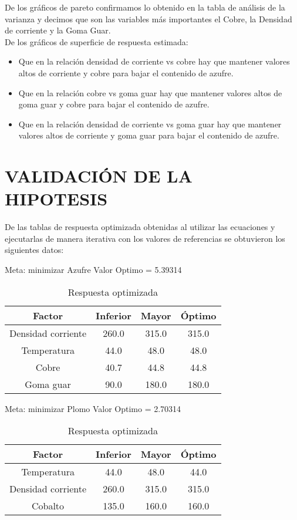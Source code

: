 De los gr\'aficos de pareto confirmamos lo obtenido en la tabla de an\'alisis de la varianza y decimos que son las variables m\'as importantes el Cobre, la Densidad de corriente y la Goma Guar.\\

De los gr\'aficos de superficie de respuesta estimada:
\begin{itemize}
 \item Que en la relaci\'on densidad de corriente vs cobre hay que mantener valores altos de corriente y cobre para bajar el contenido de azufre.
 \item Que en la relaci\'on cobre vs goma guar hay que mantener valores altos de goma guar y cobre para bajar el contenido de azufre.
 \item Que en la relaci\'on densidad de corriente vs goma guar hay que mantener valores altos de corriente y goma guar para bajar el contenido de azufre.
\end{itemize}

\section{VALIDACI\'ON DE LA HIPOTESIS}
De las tablas de respuesta optimizada obtenidas al utilizar las ecuaciones y ejecutarlas de manera iterativa con los valores de referencias se obtuvieron los siguientes datos:

Meta: minimizar Azufre \phantom{eres un pendejo} Valor Optimo = 5.39314

\begin{table}[H]
\label{tabla41}
\begin{center}
\begin{tabular}{|c|c|c|c|}
\hline
Factor&Inferior&Mayor&\'Optimo\\
\hline
Densidad corriente&260.0&315.0&315.0\\  
\hline
Temperatura&44.0&48.0&48.0\\
\hline
Cobre&40.7&44.8&44.8\\
\hline
Goma guar&90.0&180.0&180.0 \\
\hline
\end{tabular}
\end{center}
\caption{Respuesta optimizada}
\end{table}

Meta: minimizar Plomo \phantom{eres un pendejo} Valor Optimo = 2.70314

\begin{table}[H]
\label{tabla42}
\begin{center}
\begin{tabular}{|c|c|c|c|}
\hline
Factor&Inferior&Mayor&\'Optimo\\
\hline
Temperatura&44.0&48.0&44.0\\
\hline
Densidad corriente&260.0&315.0&315.0\\
\hline
Cobalto&135.0&160.0&160.0\\
\hline
\end{tabular}
\end{center}
\caption{Respuesta optimizada}
\end{table}

